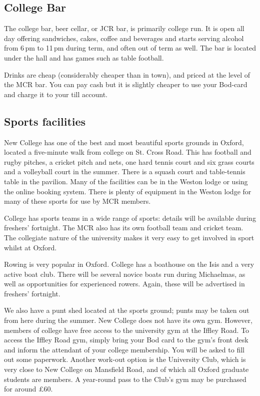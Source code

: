 \documentclass[a4paper,fleqn,12pt]{book} %
\begin{document}
\subsection{College Bar}
The college bar, beer cellar, or JCR bar, is primarily college run. It is open
all day offering sandwiches, cakes, coffee and beverages and starts serving
alcohol from 6\,pm to 11\,pm during term, and often out of term as well. The bar
is located under the hall and has games such as table football.

Drinks are cheap (considerably cheaper than in town), and priced at the
level of the MCR bar. You can pay cash but it is slightly cheaper to use your Bod-card and charge it to your till account.

\subsection{Sports facilities}
New College has one of the best and most beautiful sports grounds in Oxford, located a five-minute walk from college on St. Cross Road. This has football and rugby pitches, a cricket pitch and nets, one hard tennis court and six grass courts and a volleyball court in the summer. There is a squash court and table-tennis table in the pavilion. Many of the facilities can be in the Weston lodge or using the online booking system. There is plenty of equipment in the Weston lodge for many of these sports for use by MCR members. 

College has sports teams in a wide range of sports: details will be available during freshers' fortnight. The MCR also has its own football team and cricket team. The collegiate nature of the university makes it very easy to get involved in sport whilst at Oxford.

Rowing is very popular in Oxford. College has a boathouse on the Isis and a very active boat club. There will be several novice boats run during Michaelmas, as well as opportunities for experienced rowers. Again, these will be advertised in freshers' fortnight.

We also have a punt shed located at the sports ground; punts may be taken out
from here during the summer. New College does not have its own gym. However,
members of college have free access to the university gym at the Iffley Road. To
access the Iffley Road gym, simply bring your Bod card to the gym's front desk
and inform the attendant of your college membership. You will be asked to fill
out some paperwork. Another work-out option is the University Club, which is
very close to New College on Mansfield Road, and of which all Oxford graduate
students are members. A year-round pass to the Club's gym may be purchased for
around \pounds60.
\end{document}
